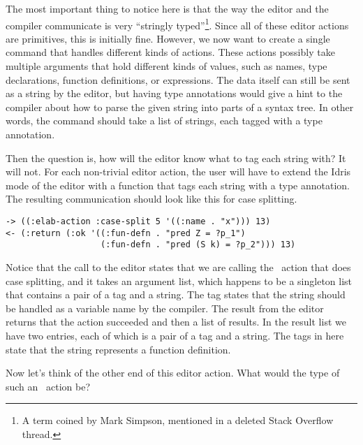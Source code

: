 The most important thing to notice here is that the way the editor and the
compiler communicate is very ``stringly typed''\footnote{A term coined by Mark
Simpson, mentioned in a deleted Stack Overflow thread.}.  Since all of these
editor actions are primitives, this is initially fine. However, we now want to
create a single command that handles different kinds of actions. These actions
possibly take multiple arguments that hold different kinds of values, such as
names, type declarations, function definitions, or expressions.
The data itself can still be sent as a string by the editor, but having type
annotations would give a hint to the compiler about how to parse the given
string into parts of a syntax tree. In other words, the command should take a
list of strings, each tagged with a type annotation.

Then the question is, how will the editor know what to tag each string with?
It will not. For each non-trivial editor action, the user will have to extend
the Idris mode of the editor with a function that tags each string with a type
annotation. The resulting communication should look like this for case splitting.

\begin{Verbatim}
-> ((:elab-action :case-split 5 '((:name . "x"))) 13)
<- (:return (:ok '((:fun-defn . "pred Z = ?p_1")
                   (:fun-defn . "pred (S k) = ?p_2"))) 13)
\end{Verbatim}
Notice that the call to the editor states that we are calling the \Elab\ action
that does case splitting, and it takes an argument list, which happens
to be a singleton list that contains a pair of a tag and a string. The tag
states that the string should be handled as a variable name by the compiler.
The result from the editor returns that the action succeeded and then a list of
results.  In the result list we have two entries, each of which is a pair of a
tag and a string.  The tags in here state that the string represents a function
definition.

Now let's think of the other end of this editor action. What would the type of
such an \Elab\ action be?

